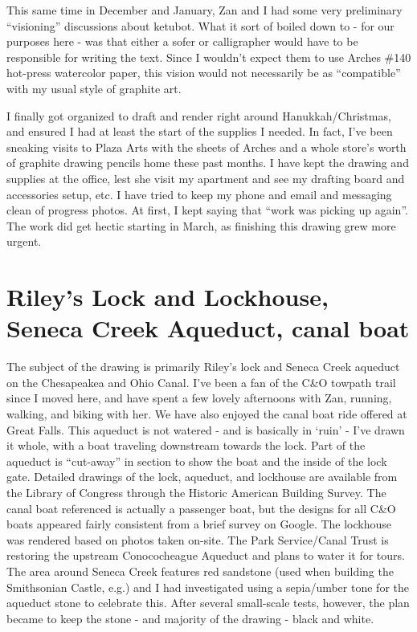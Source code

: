﻿\documentclass[letterpaper, 12pt, landscape]{ProgressBook}
\begin{document}
This same time in December and January, Zan and I had some very
preliminary ``visioning'' discussions about ketubot. What it sort of
boiled down to - for our purposes here - was that either a sofer or
calligrapher would have to be responsible for writing the text. Since I
wouldn’t expect them to use Arches \#140 hot-press watercolor paper, this vision
would not necessarily be as ``compatible'' with my usual style of
graphite art.

I finally got organized to draft and render right around
Hanukkah/Christmas, and ensured I had at least the start of the supplies I
needed. In fact, I’ve been sneaking visits to Plaza Arts with the sheets of
Arches and a whole store’s worth of graphite drawing pencils home these past
months. I have kept the drawing and supplies at the office, lest she visit my
apartment and see my drafting board and accessories setup, etc.
I have tried to keep my phone and email and messaging clean of
progress photos. At first, I kept saying that ``work was picking up again''.
The work did get hectic starting in March, as finishing this drawing grew more
urgent.

\section*{Riley’s Lock and Lockhouse, Seneca Creek Aqueduct, canal boat}

The subject of the drawing is primarily Riley's lock and Seneca
Creek aqueduct on the Chesapeakea and Ohio Canal. I've been a fan of the
C\&O towpath trail since I moved here, and have spent a few lovely
afternoons with Zan, running, walking, and biking with her. We have also
enjoyed the canal boat ride offered at Great Falls.
This aqueduct is not watered - and is basically in `ruin' - I've
drawn it whole, with a boat traveling downstream towards the lock. Part of the
aqueduct is ``cut-away'' in section to show the boat and the inside of
the lock gate. Detailed drawings of the lock, aqueduct, and lockhouse are
available from the Library of Congress through the Historic American Building
Survey. The canal boat referenced is actually a passenger boat, but the designs
for all C\&O boats appeared fairly consistent from a brief survey on Google.
The lockhouse was rendered based on photos taken on-site.
The Park Service/Canal Trust is restoring the upstream
Conococheague Aqueduct and plans to water it for tours. The area around Seneca
Creek features red sandstone (used when building the Smithsonian Castle, e.g.)
and I had investigated using a sepia/umber tone for the aqueduct stone to
celebrate this. After several small-scale tests, however, the plan became to
keep the stone - and majority of the drawing - black and white.
\end{document}
